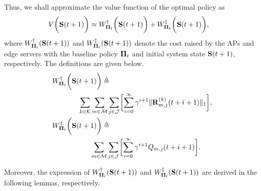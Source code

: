 Thus, we shall approximate the value function of the optimal policy as
\begin{align}
    &V\bigg(\mathbf{S}(t+1)\bigg) \approx
    W^{\dagger}_{\boldsymbol{\Pi}_{t}} \bigg(\mathbf{S}(t+1)\bigg) +
    W^{\ddagger}_{\boldsymbol{\Pi}_{t}} \bigg(\mathbf{S}(t+1)\bigg),
\end{align}
where $W^{\dagger}_{\boldsymbol{\Pi}_{t}}(\mathbf{S}(t+1))$ and $W^{\ddagger}_{\boldsymbol{\Pi}_{t}}(\mathbf{S}(t+1))$ denote the cost raised by the APs and edge servers with the baseline policy $\boldsymbol{\Pi}_{t}$ and initial system state $\mathbf{S}(t+1)$, respectively.
The definitions are given below.
\begin{align}
    &W^{\dagger}_{\Baseline_{t}} \Paren{\Stat(t+1)} \define
    \nonumber\\
    &~~~~~~~~~~~\sum_{k\in\apSet}\sum_{m\in\esSet}\sum_{j\in\jSpace}\Bracket{
        \sum_{i=0}^{\infty} \gamma^{i+1} \Inorm{\vec{R}^{(k)}_{m,j}(t+i+1)}
    },
    \\    
    &W^{\ddagger}_{\Baseline_{t}}\Paren{\Stat(t+1)} \define
    \nonumber\\
    &~~~~~~~~~~~~~~~~\sum_{m\in\esSet}\sum_{j\in\jSpace}\Bracket{
        \sum_{i=0}^{\infty} \gamma^{i+1} Q_{m,j}(t+i+1)
    }.
\end{align}

Moreover, the expression of $W^{\dagger}_{\boldsymbol{\Pi}_{t}}(\mathbf{S}(t+1))$ and $W^{\ddagger}_{\boldsymbol{\Pi}_{t}}(\mathbf{S}(t+1))$ are derived in the following lemmas, respectively.

